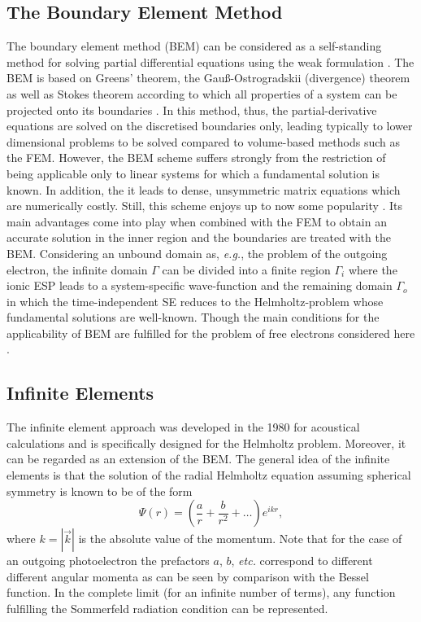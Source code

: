 \subsection{The Boundary Element Method}
The boundary element method (BEM) can be considered as a self-standing method for solving partial differential equations using the weak formulation \cite{bemDai,bemCostabel}.
The BEM is based on Greens' theorem, the Gau\ss-Ostrogradskii (divergence) theorem as well as Stokes theorem according to which all properties of a system can be projected onto its boundaries \cite{bemBook}.
In this method, thus, the partial-derivative equations are solved on the discretised boundaries only, leading typically to lower dimensional problems to be solved compared to volume-based methods such as the FEM.
However, the BEM scheme suffers strongly from the restriction of being applicable only to linear systems for which a fundamental solution is known.
In addition, the it leads to dense, unsymmetric matrix equations \cite{bemCostabel} which are numerically costly.
Still, this scheme enjoys up to now some popularity \cite{bem1,bem2,bem3}.
Its main advantages come into play when combined with the FEM \cite{bem-fem} to obtain an accurate solution in the inner region and the boundaries are treated with the BEM.
Considering an unbound domain as, \textit{e.g.}, the problem of the outgoing electron, the infinite domain $\Gamma$ can be divided into a finite region $\Gamma_i$ where the ionic ESP leads to a system-specific wave-function and the remaining domain $\Gamma_o$ in which the time-independent SE reduces to the Helmholtz-problem whose fundamental solutions are well-known.
Though the main conditions for the applicability of BEM are fulfilled for the problem of free electrons considered here \cite{bemCostabel, bettessBEM}.

\subsection{Infinite Elements}
\label{ch:InfEl}
The infinite element approach was developed in the 1980 for acoustical calculations and is specifically designed for the Helmholtz problem.
Moreover, it can be regarded as an extension of the BEM.
The general idea of the infinite elements is that the solution of the radial Helmholtz equation assuming spherical symmetry is known to be of the form
\begin{equation} \label{eq:infAnsatz}
 \Psi(r) = \left(\frac ar +\frac{b}{r^2} + \hdots \right) e^{ikr},
\end{equation}
where $k=|\vec{k}|$ is the absolute value of the momentum. 
Note that for the case of an outgoing photoelectron the prefactors $a$, $b$, \textit{etc.} correspond to different different angular momenta as can be seen by comparison with the Bessel function.
In the complete limit (for an infinite number of terms), any function fulfilling the Sommerfeld radiation condition \cite{sommerfeldCond}  can be represented.

